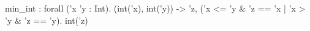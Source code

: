 min_int : forall ('x 'y : Int). (int('x), int('y)) -> {'z, ('x <= 'y & 'z == 'x | 'x > 'y & 'z == 'y). int('z)}